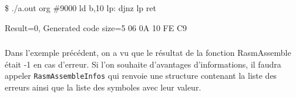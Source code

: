 
\begin{code}
\$ ./a.out 
org \#9000 
    ld b,10 
lp: djnz lp 
    ret 

Result=0, Generated code size=5
06 0A 10 FE C9 
\end{code}

\subsubsection{}
\begin{xfr}
Dans l'exemple précédent, on a vu que le résultat de la fonction RasmAssemble était -1 en cas d'erreur. Si l'on souhaite d'avantages d'informations, il faudra appeler \texttt{RasmAssembleInfos} qui renvoie une structure contenant la liste des erreurs ainsi que la liste des symboles avec leur valeur.


\end{xfr}
